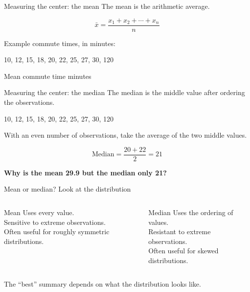 \documentclass[11pt,aspectratio=169]{beamer}
\newcommand{\bigquestion}[1]{%
\begin{center}
\begin{minipage}{0.88\textwidth}
\centering
\Large\color{LBJnavy}\textbf{#1}
\end{minipage}
\end{center}}
\begin{document}
\begin{frame}{Measuring the center: the mean}
The \alert{mean} is the arithmetic average.

\vspace{0.6em}
\[
\bar{x}=\frac{x_1+x_2+\cdots+x_n}{n}
\]

\vspace{0.4em}
Example commute times, in minutes:

\begin{center}
10, 12, 15, 18, 20, 22, 25, 27, 30, 120
\end{center}

\vfill
\begin{alertblock}{Mean commute time} \pause
{} minutes
\end{alertblock}
\end{frame}

\begin{frame}{Measuring the center: the median}
The \alert{median} is the middle value after ordering the observations.

\vspace{0.6em}
\begin{center}
10, 12, 15, 18, \alert{20, 22}, 25, 27, 30, 120
\end{center}

With an even number of observations, take the average of the two middle values.

\[
\text{Median}=\frac{20+22}{2}=21
\]

\vfill
\bigquestion{Why is the mean 29.9 but the median only 21?}
\end{frame}

\begin{frame}{Mean or median? Look at the distribution}
\begin{columns}[T,onlytextwidth]
\begin{block}{Mean}
Uses every value.\\[0.4em]
Sensitive to extreme observations.\\[0.4em]
Often useful for roughly symmetric distributions.
\end{block}
\begin{block}{Median}
Uses the ordering of values.\\[0.4em]
Resistant to extreme observations.\\[0.4em]
Often useful for skewed distributions.
\end{block}
\end{columns}
\vfill
\alert{The ``best'' summary depends on what the distribution looks like.}
\end{frame}
\end{document}
